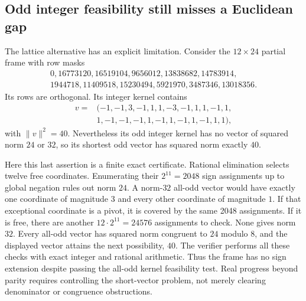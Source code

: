 \subsection{Odd integer feasibility still misses a Euclidean gap}
The lattice alternative has an explicit limitation. Consider the
$12\times24$ partial frame with row masks
\[
\begin{gathered}
0,16773120,16519104,9656012,13838682,14783914,\\
1944718,11409518,15230494,5921970,3487346,13018356.
\end{gathered}
\]
Its rows are orthogonal. Its integer kernel contains
\[
\begin{split}
v={}&(-1,-1,3,-1,1,1,-3,-1,1,1,-1,1,\\
&1,-1,-1,-1,1,-1,1,-1,1,-1,1,1),
\end{split}
\]
with $\|v\|^2=40$. Nevertheless its odd integer kernel has no vector
of squared norm $24$ or $32$, so its shortest odd vector has squared
norm exactly $40$.

Here this last assertion is a finite exact certificate. Rational
elimination selects twelve free coordinates. Enumerating their
$2^{11}=2048$ sign assignments up to global negation rules out norm
$24$. A norm-$32$ all-odd vector would have exactly one coordinate
of magnitude $3$ and every other coordinate of magnitude $1$.
If that exceptional coordinate is a pivot, it is covered by the same
2048 assignments. If it is free, there are another
$12\cdot2^{11}=24576$ assignments to check. None gives norm $32$.
Every all-odd vector has squared norm congruent to $24$ modulo $8$,
and the displayed vector attains the next possibility, $40$.
The verifier performs all these checks with exact integer and rational
arithmetic. Thus the frame has no sign extension despite passing the
all-odd kernel feasibility test. Real progress beyond parity requires
controlling the short-vector problem, not merely clearing denominator
or congruence obstructions.
